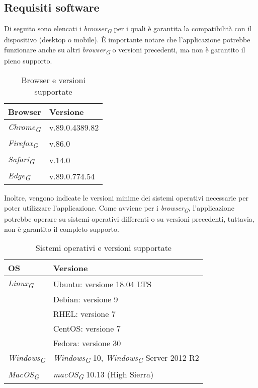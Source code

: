 \subsection{Requisiti software}
Di seguito sono elencati i \textit{browser}\textsubscript{\textit{G}} per i quali è garantita la compatibilità con il dispositivo (desktop o mobile). È importante notare che l'applicazione potrebbe funzionare anche su altri \textit{browser}\textsubscript{\textit{G}} o versioni precedenti, ma non è garantito il pieno supporto.  
\begin{table}[H]
    \centering
    \begin{tabular}{ll}
        \toprule
        \textbf{Browser} & \textbf{Versione} \\
        \midrule
        \textit{Chrome}\textsubscript{\textit{G}} & v.89.0.4389.82\\
        \textit{Firefox}\textsubscript{\textit{G}} & v.86.0 \\
        \textit{Safari}\textsubscript{\textit{G}} & v.14.0 \\
        \textit{Edge}\textsubscript{\textit{G}} & v.89.0.774.54 \\
        \bottomrule
    \end{tabular}
    \caption{Browser e versioni supportate}
\end{table}

Inoltre, vengono indicate le versioni minime dei sistemi operativi necessarie per poter utilizzare l'applicazione. Come avviene per i \textit{browser}\textsubscript{\textit{G}}, l'applicazione potrebbe operare su sistemi operativi differenti o su versioni precedenti, tuttavia, non è garantito il completo supporto.\\
\begin{table}[H]
    \centering
    \begin{tabular}{ll}
        \toprule
        \textbf{OS} & \textbf{Versione} \\
        \midrule
        \textit{Linux}\textsubscript{\textit{G}} & Ubuntu: versione 18.04 LTS\\&Debian: versione 9\\& RHEL: versione 7\\& CentOS: versione 7\\& Fedora: versione 30 \\
        \textit{Windows}\textsubscript{\textit{G}} & \textit{Windows}\textsubscript{\textit{G}} 10, \textit{Windows}\textsubscript{\textit{G}} Server 2012 R2 \\
        \textit{MacOS}\textsubscript{\textit{G}} & \textit{macOS}\textsubscript{\textit{G}} 10.13 (High Sierra) \\
        \bottomrule
    \end{tabular}
    \caption{Sistemi operativi e versioni supportate}
\end{table} 